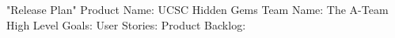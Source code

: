 "Release Plan"
Product Name: UCSC Hidden Gems 
Team Name: The A-Team
High Level Goals: 
User Stories: 
Product Backlog: 

